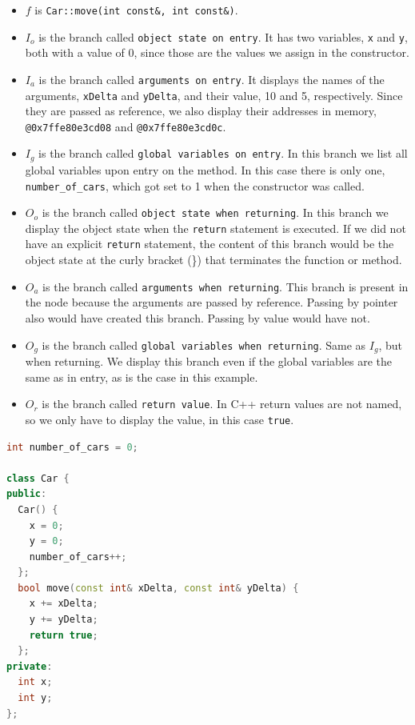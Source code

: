 \begin{definition}[Node]
\begin{exmp}
\begin{itemize}
    \item \(f\) is \verb|Car::move(int const&, int const&)|.
    \item \(I_o\) is the branch called \verb|object state on entry|. It has two variables, \verb|x| and \verb|y|, both with a value of 0, since those are the values we assign in the constructor.
    \item \(I_a\) is the branch called \verb|arguments on entry|. It displays the names of the arguments, \verb|xDelta| and \verb|yDelta|, and their value, 10 and 5, respectively. Since they are passed as reference, we also display their addresses in memory, \verb"@0x7ffe80e3cd08" and \verb"@0x7ffe80e3cd0c".
    \item \(I_g\) is the branch called \verb|global variables on entry|. In this branch we list all global variables upon entry on the method. In this case there is only one, \verb|number_of_cars|, which got set to 1 when the constructor was called.
    \item \(O_o\) is the branch called \verb|object state when returning|. In this branch we display the object state when the \verb|return| statement is executed. If we did not have an explicit \verb|return| statement, the content of this branch would be the object state at the curly bracket (\}) that terminates the function or method. 
    \item \(O_a\) is the branch called \verb|arguments when returning|. This branch is present in the node because the arguments are passed by reference. Passing by pointer also would have created this branch. Passing by value would have not.
    \item \(O_g\) is the branch called \verb|global variables when returning|. Same as \(I_g\), but when returning. We display this branch even if the global variables are the same as in entry, as is the case in this example.
    \item \(O_r\) is the branch called \verb|return value|. In C++ return values are not named, so we only have to display the value, in this case \verb|true|. 
\end{itemize}

\begin{lstlisting}[style=interfaces, language=C++, caption=Car class, frame=tb, label={lst:carClass}]
int number_of_cars = 0;

class Car {
public:
  Car() {
    x = 0;
    y = 0;
    number_of_cars++;
  };
  bool move(const int& xDelta, const int& yDelta) {
    x += xDelta;
    y += yDelta;
    return true;
  };
private:
  int x;
  int y;
};


\end{lstlisting}
\end{exmp}
\end{definition}
